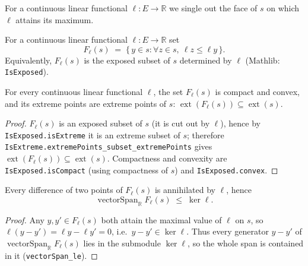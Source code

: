 For a continuous linear functional $\ell : E \to \mathbb R$ we single out the
face of $s$ on which $\ell$ attains its maximum.

\begin{definition}
    \label{def:exposed-face}
    \leanok
    For a continuous linear functional $\ell : E \to \mathbb R$ set
    \[
        F_\ell(s) \;=\; \{\, y \in s : \forall z \in s,\ \ell z \le \ell y \,\}.
    \]
    Equivalently, $F_\ell(s)$ is the exposed subset of $s$ determined by $\ell$
    (Mathlib: \texttt{IsExposed}).
\end{definition}

\begin{lemma}
    \label{lem:exposed-face}
    \leanok
    For every continuous linear functional $\ell$, the set $F_\ell(s)$ is compact
    and convex, and its extreme points are extreme points of $s$:
    $\operatorname{ext}(F_\ell(s)) \subseteq \operatorname{ext}(s)$.
\end{lemma}
\begin{proof}
    $F_\ell(s)$ is an exposed subset of $s$ (it is cut out by $\ell$), hence by
    \texttt{IsExposed.isExtreme} it is an extreme subset of $s$; therefore
    \texttt{IsExtreme.extremePoints\_subset\_extremePoints} gives
    $\operatorname{ext}(F_\ell(s)) \subseteq \operatorname{ext}(s)$. Compactness
    and convexity are \texttt{IsExposed.isCompact} (using compactness of $s$) and
    \texttt{IsExposed.convex}.
\end{proof}

\begin{lemma}
    \label{lem:face-vectorspan-le-ker}
    \leanok
    Every difference of two points of $F_\ell(s)$ is annihilated by $\ell$, hence
    \[
        \operatorname{vectorSpan}_{\mathbb R} F_\ell(s) \;\le\; \ker \ell .
    \]
\end{lemma}
\begin{proof}
    Any $y, y' \in F_\ell(s)$ both attain the maximal value of $\ell$ on $s$, so
    $\ell(y - y') = \ell y - \ell y' = 0$, i.e.\ $y - y' \in \ker \ell$. Thus every
    generator $y - y'$ of $\operatorname{vectorSpan}_{\mathbb R} F_\ell(s)$ lies in
    the submodule $\ker \ell$, so the whole span is contained in it
    (\texttt{vectorSpan\_le}).
\end{proof}

